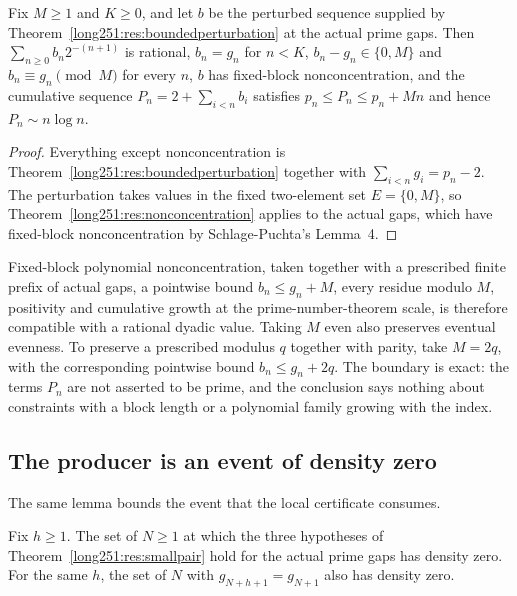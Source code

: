 \documentclass[11pt]{article}
\begin{document}
\begin{corollary}\label{long251:res:nonconc-primes}
Fix $M\ge1$ and $K\ge0$, and let $b$ be the perturbed sequence supplied by
Theorem~\ref{long251:res:boundedperturbation} at the actual prime gaps.  Then
$\sum_{n\ge0}b_n2^{-(n+1)}$ is rational, $b_n=g_n$ for $n<K$,
$b_n-g_n\in\{0,M\}$ and $b_n\equiv g_n\pmod M$ for every $n$, $b$ has
fixed-block nonconcentration, and the cumulative sequence
$P_n=2+\sum_{i<n}b_i$ satisfies $p_n\le P_n\le p_n+Mn$ and hence
$P_n\sim n\log n$.
\end{corollary}

\begin{proof}
Everything except nonconcentration is Theorem~\ref{long251:res:boundedperturbation}
together with $\sum_{i<n}g_i=p_n-2$.  The perturbation takes values in the
fixed two-element set $E=\{0,M\}$, so Theorem~\ref{long251:res:nonconcentration}
applies to the actual gaps, which have fixed-block nonconcentration by
Schlage-Puchta's Lemma~4.
\end{proof}

Fixed-block polynomial nonconcentration, taken together with a prescribed
finite prefix of actual gaps, a pointwise bound $b_n\le g_n+M$, every residue
modulo $M$, positivity and cumulative growth at the prime-number-theorem scale,
is therefore compatible with a rational dyadic value.  Taking $M$ even also
preserves eventual evenness.  To preserve a prescribed modulus $q$ together
with parity, take $M=2q$, with the corresponding pointwise bound
$b_n\le g_n+2q$.  The boundary is exact: the terms $P_n$ are not asserted to be prime,
and the conclusion says nothing about constraints with a block length or a
polynomial family growing with the index.

\subsection{The producer is an event of density zero}

The same lemma bounds the event that the local certificate consumes.

\begin{theorem}\label{long251:res:sparse}
Fix $h\ge1$.  The set of $N\ge1$ at which the three hypotheses of
Theorem~\ref{long251:res:smallpair} hold for the actual prime gaps has density zero.
For the same $h$, the set of $N$ with $g_{N+h+1}=g_{N+1}$ also has density
zero.
\end{theorem}
\end{document}
